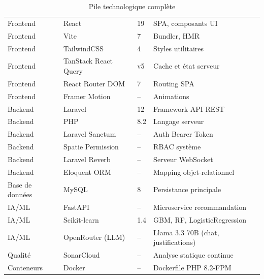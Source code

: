 \begin{table}[H]
  \centering
  \caption{Pile technologique complète}
  \label{tab:techstack}
  \small
  \begin{tabularx}{\textwidth}{L{3cm}L{3.5cm}C{1.8cm}X}
    \toprule
     &  &  &  \\
    \midrule
    Frontend      & React                & 19      & SPA, composants UI \\
    Frontend      & Vite                 & 7       & Bundler, HMR \\
    Frontend      & TailwindCSS          & 4       & Styles utilitaires \\
    Frontend      & TanStack React Query & v5      & Cache et état serveur \\
    Frontend      & React Router DOM     & 7       & Routing SPA \\
    Frontend      & Framer Motion        & --      & Animations \\
    Backend       & Laravel              & 12      & Framework API REST \\
    Backend       & PHP                  & 8.2     & Langage serveur \\
    Backend       & Laravel Sanctum      & --      & Auth Bearer Token \\
    Backend       & Spatie Permission    & --      & RBAC système \\
    Backend       & Laravel Reverb       & --      & Serveur WebSocket \\
    Backend       & Eloquent ORM         & --      & Mapping objet-relationnel \\
    Base de données & MySQL              & 8       & Persistance principale \\
    IA/ML         & FastAPI              & --      & Microservice recommandation \\
    IA/ML         & Scikit-learn         & 1.4     & GBM, RF, LogisticRegression \\
    IA/ML         & OpenRouter (LLM)     & --      & Llama 3.3 70B (chat, justifications) \\
    Qualité       & SonarCloud           & --      & Analyse statique continue \\
    Conteneurs    & Docker               & --      & Dockerfile PHP 8.2-FPM \\
    \bottomrule
  \end{tabularx}
\end{table}

